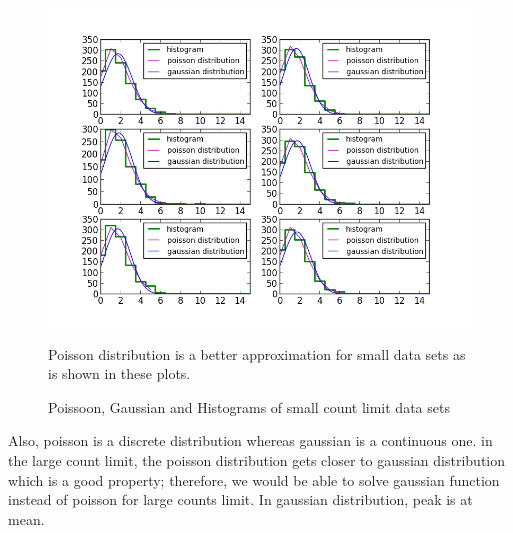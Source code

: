 \documentclass[letterpaper,12pt]{article}
\begin{document}
\begin{figure}
\centering
\includegraphics[scale=0.9]{poisson-gaussian-histograms-8.png}
\caption{Poissoon, Gaussian and Histograms of small count limit data sets}
Poisson distribution is a better approximation for small data sets as is shown in these plots.\end{figure}

 Also, poisson is a discrete distribution whereas gaussian is a continuous one. in the large count limit, the poisson distribution gets closer to gaussian distribution which is a good property; therefore, we would be able to solve gaussian function instead of poisson for large counts limit. In gaussian distribution, peak is at mean.
 
\end{document}
